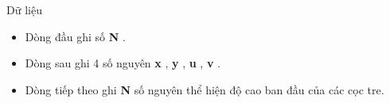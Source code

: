 Dữ liệu
\begin{itemize}
	\item     Dòng đầu ghi số    \textbf{     N    }    .   
	\item     Dòng sau ghi 4 số nguyên    \textbf{     x    }    ,    \textbf{     y    }    ,    \textbf{     u    }    ,    \textbf{     v    }    .   
	\item     Dòng tiếp theo ghi    \textbf{     N    }    số nguyên thể hiện độ cao ban đầu của các cọc tre.   
\end{itemize}